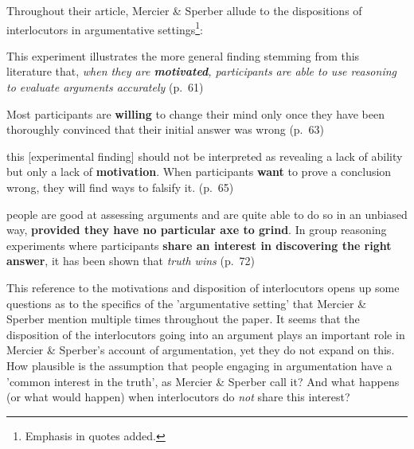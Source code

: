 Throughout their \citeyear{MS11} article, Mercier \& Sperber allude to the dispositions
of interlocutors in argumentative settings\footnote{Emphasis in quotes added.}:
\begin{quoting}
    This experiment illustrates the more general finding stemming from this literature that, \emph{when they are \textbf{motivated}, participants are able to use reasoning to evaluate arguments accurately}
    \hfill (p.~61)
\end{quoting}
\begin{quoting}
    Most participants are \textbf{willing} to change their mind only once they have been thoroughly convinced that their initial answer was wrong
    \hfill (p.~63)
\end{quoting}
\begin{quoting}
    this [experimental finding] should not be interpreted as revealing a lack of ability but only a lack of \textbf{motivation}. When participants \textbf{want} to prove a conclusion wrong, they will find ways to falsify it.
    \hfill (p.~65)
\end{quoting}
\begin{quoting}
    people are good at assessing arguments and are quite able to do so in an unbiased way, \textbf{provided they have no particular axe to grind}. In group reasoning experiments where participants \textbf{share an interest in discovering the right answer}, it has been shown that \emph{truth wins}
    \hfill (p.~72)
\end{quoting}
This reference to the motivations and disposition of interlocutors opens up some questions as to the specifics of the 'argumentative setting' that Mercier \& Sperber mention multiple times throughout the paper. It seems that the disposition of the interlocutors going into an argument plays an important role in Mercier \& Sperber's account of argumentation, yet they do not expand on this.
How plausible is the assumption that people engaging in argumentation have a 'common interest in the truth', as Mercier \& Sperber call it? And what happens (or what would happen) when interlocutors do \emph{not} share this interest?


